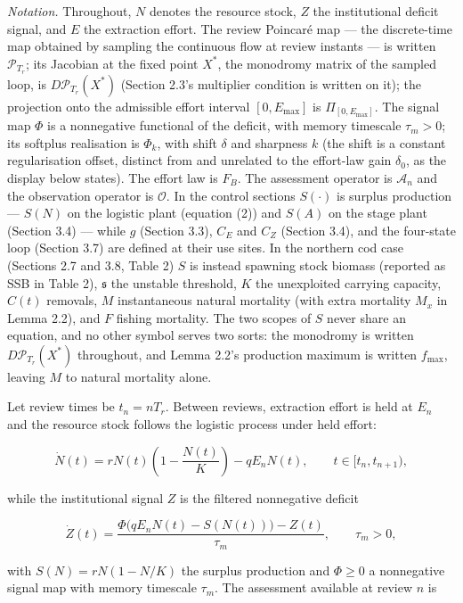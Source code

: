 \documentclass[11pt]{article}
\begin{document}
\emph{Notation.} Throughout, \(N\) denotes the resource stock, \(Z\) the
institutional deficit signal, and \(E\) the extraction effort. The
review Poincar\'e map --- the discrete-time map obtained by sampling the
continuous flow at review instants --- is written \(\mathcal P_{T_r}\);
its Jacobian at the fixed point \(X^*\), the monodromy matrix of the
sampled loop, is \(D\mathcal P_{T_r}(X^*)\) (Section 2.3's multiplier
condition is written on it); the projection onto the admissible effort
interval \([0,E_{\max}]\) is \(\Pi_{[0,E_{\max}]}\). The signal map
\(\Phi\) is a nonnegative functional of the deficit, with memory
timescale \(\tau_m>0\); its softplus realisation is \(\Phi_k\), with
shift \(\delta\) and sharpness \(k\) (the shift is a constant
regularisation offset, distinct from and unrelated to the effort-law
gain \(\delta_0\), as the display below states). The effort law is
\(F_B\). The assessment operator is \(\mathcal A_n\) and the observation
operator is \(\mathcal O\). In the control sections \(S(\cdot)\) is
surplus production --- \(S(N)\) on the logistic plant (equation (2)) and
\(S(A)\) on the stage plant (Section 3.4) --- while \(g\) (Section 3.3),
\(C_E\) and \(C_Z\) (Section 3.4), and the four-state loop (Section 3.7)
are defined at their use sites. In the northern cod case (Sections 2.7
and 3.8, Table 2) \(S\) is instead spawning stock biomass (reported as
SSB in Table 2), \(\mathfrak s\) the unstable threshold, \(K\) the
unexploited carrying capacity, \(C(t)\) removals, \(M\) instantaneous
natural mortality (with extra mortality \(M_x\) in Lemma 2.2), and \(F\)
fishing mortality. The two scopes of \(S\) never share an equation, and
no other symbol serves two sorts: the monodromy is written
\(D\mathcal P_{T_r}(X^*)\) throughout, and Lemma 2.2's production
maximum is written \(f_{\max}\), leaving \(M\) to natural mortality
alone.

Let review times be \(t_n=nT_r\). Between reviews, extraction effort is
held at \(E_n\) and the resource stock follows the logistic process
under held effort:

\[
\dot N(t)=rN(t)\left(1-\frac{N(t)}{K}\right)-qE_nN(t),\qquad t\in[t_n,t_{n+1}),
\tag{1}
\]

while the institutional signal \(Z\) is the filtered nonnegative deficit

\[
\dot Z(t)=\frac{\Phi\bigl(qE_nN(t)-S(N(t))\bigr)-Z(t)}{\tau_m},\qquad \tau_m>0,
\tag{2}
\]

with \(S(N)=rN(1-N/K)\) the surplus production and \(\Phi\ge 0\) a
nonnegative signal map with memory timescale \(\tau_m\). The assessment
available at review \(n\) is
\end{document}
